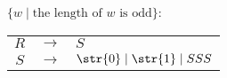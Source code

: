 $\{w \mid \text{the length of $w$ is odd}\}$: \par
\begin{tabular}{ccl}
	$R$ & $\rightarrow$ & $S$ \\
	$S$ & $\rightarrow$ & $\str{0} \mid \str{1} \mid SSS$ \\
\end{tabular}